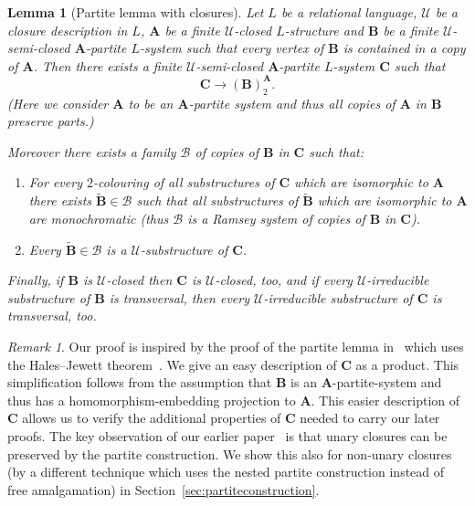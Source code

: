 \documentclass{elsarticle}
\def\str#1{\mathbf {#1}}
\theoremstyle{plain}
\newtheorem{lemma}[theorem]{Lemma}
\theoremstyle{definition}
\theoremstyle{remark}
\newtheorem*{remark}{Remark}
\begin{document}
\begin{lemma}[Partite lemma with closures]\label{partlem}
Let $L$ be a relational language, $\mathcal U$ be a closure description in $L$,
$\str{A}$ be a finite $\mathcal U$-closed $L$-structure and $\str{B}$ be a finite $\mathcal U$-semi-closed $\str{A}$-partite $L$-system such that every vertex of $\str{B}$ is contained in a copy of $\str{A}$.
Then there exists a finite $\mathcal U$-semi-closed $\str{A}$-partite $L$-system $\str{C}$
such that 
$$
\str{C}\longrightarrow (\str{B})^\str{A}_2.
$$
(Here we consider $\str{A}$ to be an $\str{A}$-partite system and thus all copies of $\str{A}$ in $\str{B}$ preserve parts.)

Moreover there exists a family $\mathcal B$ of copies of $\str{B}$ in $\str{C}$ such that:
\begin{enumerate} 
\item \label{lem:partitni:family}For every $2$-colouring of all substructures of $\str{C}$ which are isomorphic to $\str{A}$ there exists $\widetilde{\str{B}}\in \mathcal B$ such that all substructures of $\widetilde{\str B}$ which are isomorphic to $\str{A}$ are monochromatic (thus $\mathcal B$ is a Ramsey system of copies of $\str{B}$ in $\str{C}$).
\item \label{lem:partitni:usubstructure}Every $\widetilde{\str{B}}\in \mathcal B$ is a $\mathcal U$-substructure of $\str{C}$.
\end{enumerate}
Finally, if $\str{B}$ is $\mathcal U$-closed then $\str{C}$ is $\mathcal U$-closed, too, and if every $\mathcal U$-irreducible substructure of $\str{B}$ is transversal, then every $\mathcal U$-irreducible substructure of $\str{C}$ is transversal, too. 
\end{lemma}

\begin{remark}
Our proof is inspired by the proof of the partite lemma in~\cite{Nevsetvril1989} which uses the Hales--Jewett theorem~\cite{Hales1963}. 
We give an easy description of $\str{C}$ as a product.
 This simplification follows from the assumption that $\str{B}$ is an $\str{A}$-partite-system and thus has a homomorphism-embedding projection to $\str{A}$.  This easier description of $\str{C}$ allows us to verify the additional properties of $\str{C}$ needed to carry our later proofs.
  The key observation of our earlier paper~\cite{Hubivcka2014} is that unary closures can be preserved by the partite construction.
  We show this also for non-unary closures (by a different technique which uses the nested partite construction instead of free amalgamation) in Section~\ref{sec:partiteconstruction}.
\end{remark}
\end{document}
